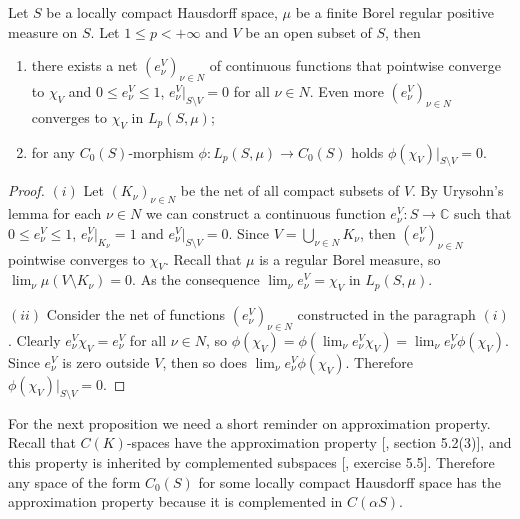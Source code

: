 \begin{proposition}\label{SuppsOfSomeFuncInC0SAndLp} Let $S$ be a locally
compact Hausdorff space, $\mu$ be a finite Borel regular positive measure on
$S$. Let $1\leq p<+\infty$ and $V$ be an open subset of $S$, then

\begin{enumerate}[label = (\roman*)]
    \item there exists a net ${(e_\nu^V)}_{\nu\in N}$ of continuous functions that
    pointwise converge to $\chi_V$ and 
    $0\leq e_\nu^V\leq 1$, $e_\nu^V|_{S\setminus V}=0$ for all $\nu\in N$. 
    Even more ${(e_\nu^V)}_{\nu\in N}$ converges to $\chi_V$ in $L_p(S,\mu)$; 

    \item for any $C_0(S)$-morphism $\phi:L_p(S,\mu)\to C_0(S)$ holds
    $\phi(\chi_V)|_{S\setminus V}=0$.
\end{enumerate}
\end{proposition}
\begin{proof} $(i)$ Let ${(K_\nu)}_{\nu\in N}$ be the net of all compact subsets of
$V$. By Urysohn's lemma for each $\nu\in N$ we can construct a continuous
function $e_\nu^V:S\to\mathbb{C}$ such that $0\leq e_\nu^V\leq 1$,
$e_\nu^V|_{K_\nu}=1$ and $e_\nu^V|_{S\setminus V}=0$. 
Since $V=\bigcup_{\nu\in N} K_\nu$, then ${(e_\nu^V)}_{\nu\in N}$ pointwise 
converges to $\chi_V$. Recall that $\mu$ is a regular Borel measure, 
so $\lim_\nu\mu(V\setminus K_\nu)=0$. As the 
consequence $\lim_\nu e_\nu^V=\chi_V$ in $L_p(S,\mu)$.

$(ii)$ Consider the net of functions ${(e_\nu^V)}_{\nu\in N}$ constructed in the
paragraph $(i)$. Clearly $e_\nu^V\chi_V=e_\nu^V$ for all $\nu\in N$, so
$\phi(\chi_V)=\phi(\lim_\nu e_\nu^V\chi_V)=\lim_\nu e_\nu^V\phi(\chi_V)$. Since
$e_\nu^V$ is zero outside $V$, then so does $\lim_\nu e_\nu^V\phi(\chi_V)$.
Therefore $\phi(\chi_V)|_{S\setminus V}=0$.
\end{proof}

For the next proposition we need a short reminder on approximation property.
Recall that $C(K)$-spaces have the approximation property
[\cite{DefFloTensNorOpId}, section 5.2(3)], and this property is inherited by
complemented subspaces [\cite{DefFloTensNorOpId}, exercise 5.5]. Therefore any
space of the form $C_0(S)$ for some locally compact Hausdorff space has the
approximation property because it is complemented in $C(\alpha S)$.

